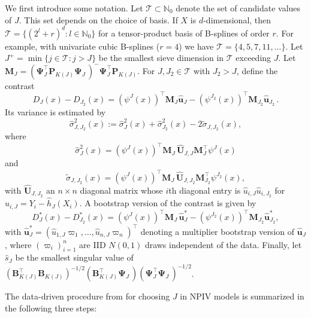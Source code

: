 \documentclass[
]{jss}
\begin{document}
We first introduce some notation. Let \(\mathcal T \subset \mathbb N_0\)
denote the set of candidate values of \(J\). This set depends on the
choice of basis. If \(X\) is \(d\)-dimensional, then
\(\mathcal T = \{(2^l + r)^d : l \in \mathbb N_0 \}\) for a
tensor-product basis of B-splines of order \(r\). For example, with
univariate cubic B-splines (\(r = 4\)) we have
\(\mathcal T = \{4,5,7, 11, ...\}\). Let
\(J^+ = \min\{j \in \mathcal T : j > J\}\) be the smallest sieve
dimension in \(\mathcal T\) exceeding \(J\). Let
\(\mathbf M_J = (\mathbf \Psi_J^\top \mathbf P_{K(J)}^{\phantom \top} \mathbf \Psi_J^{\phantom \top} )^{-} \mathbf \Psi_J^\top \mathbf P_{K(J)}^{\phantom \top}\).
For \(J,J_2 \in \mathcal T\) with \(J_2 > J\), define the contrast \[
D_{J}(x)-D_{J_2}(x) = (\psi^J(x))^\top \mathbf M_J \hat{\mathbf  u}_J - (\psi^{J_2}(x))^\top \mathbf M_{J_2} \hat{\mathbf u}_{J_2} \,.
\] Its variance is estimated by \[
 \hat \sigma_{J,J_2}^2(x) := \hat \sigma_{J}^2(x) + \hat \sigma_{J_2}^2(x) - 2 \tilde \sigma_{J,J_2}(x),
\] where \[
 \hat \sigma_{J}^2(x) =  (\psi^J(x))^\top \mathbf M_J^{\phantom \top} \widehat{\mathbf U}_{J,J}^{\phantom \top} \mathbf M_J^\top \psi^J(x)
\] and \[
 \tilde \sigma_{J,J_2}(x)  = (\psi^J(x))^\top \mathbf M_J^{\phantom \top} \widehat{\mathbf U}_{J,J_2}^{\phantom \top} \mathbf M_{J_2}^\top \psi^{J_2}(x),
\] with \(\widehat{\mathbf U}_{J,J_2}\) an \(n\times n\) diagonal matrix
whose \(i\)th diagonal entry is \(\hat u_{i,J} \hat u_{i,J_2}\) for
\(\hat u_{i,J} = Y_i - \hat h_J(X_i)\). A bootstrap version of the
contrast is given by \[
D_{J}^*(x)-D_{J_2}^*(x) = (\psi^J(x))^\top\mathbf M_J^{\phantom \top}  \hat{\mathbf u}_J^* - (\psi^{J_2}(x))^\top \mathbf M_{J_2}^{\phantom \top} \hat{\mathbf u}_{J_2}^*,
\] with
\(\hat{\mathbf u}_J^* = (\hat u_{1,J}\varpi_1,\ldots,\hat u_{n,J}\varpi_n)^\top\)
denoting a multiplier bootstrap version of \(\hat{\mathbf u}_J\), where
\((\varpi_i)_{i=1}^n\) are IID \(N(0,1)\) draws independent of the data.
Finally, let \(\hat s_J\) be the smallest singular value of
\((\mathbf B_{K(J)}^\top\mathbf B_{K(J)}^{\phantom \top})^{-1/2} (\mathbf B_{K(J)}^\top \mathbf \Psi_J^{\phantom \top}) (\mathbf \Psi_J^\top \mathbf \Psi_J^{\phantom \top})^{-1/2}\).

The data-driven procedure from \citet{CCK} for choosing \(J\) in NPIV
models is summarized in the following three steps:
\end{document}
